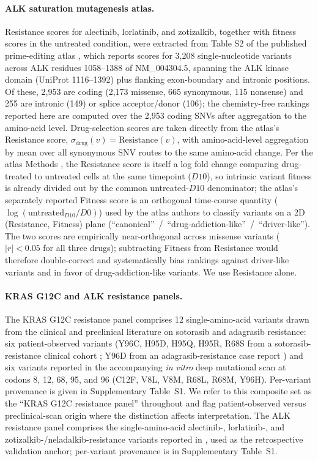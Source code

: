 \documentclass[11pt,a4paper]{article}
\begin{document}
\paragraph{ALK saturation mutagenesis atlas.}
Resistance scores for alectinib, lorlatinib, and zotizalkib, together with
fitness scores in the untreated condition, were extracted from Table S2
of the published prime-editing atlas \citep{oh2026}, which reports scores
for 3,208 single-nucleotide variants across ALK residues 1058--1388 of
NM\_004304.5, spanning the ALK kinase domain (UniProt 1116--1392) plus
flanking exon-boundary and intronic positions. Of these, 2,953 are coding (2,173
missense, 665 synonymous, 115 nonsense) and 255 are intronic (149) or
splice acceptor/donor (106); the chemistry-free rankings reported here
are computed over the 2,953 coding SNVs after aggregation to the
amino-acid level. Drug-selection scores are taken directly from the
atlas's Resistance score, $\sigma_{\mathrm{drug}}(v) =
\text{Resistance}(v)$, with amino-acid-level aggregation by mean over
all synonymous SNV routes to the same amino-acid change. Per the
atlas Methods \citep{oh2026}, the Resistance score is itself a
log fold change comparing drug-treated to untreated cells at the same
timepoint ($D10$), so intrinsic variant fitness is already divided out
by the common untreated-$D10$ denominator; the atlas's separately
reported Fitness score is an orthogonal time-course quantity
($\log(\text{untreated}_{D10}/D0)$) used by the atlas authors to
classify variants on a 2D (Resistance, Fitness) plane
(``canonical''~/~``drug-addiction-like''~/~``driver-like''). The two
scores are empirically near-orthogonal across missense variants
($|r| < 0.05$ for all three drugs); subtracting Fitness from
Resistance would therefore double-correct and systematically bias
rankings against driver-like variants and in favor of
drug-addiction-like variants. We use Resistance alone.

\paragraph{KRAS G12C and ALK resistance panels.}
The KRAS G12C resistance panel comprises 12 single-amino-acid variants
drawn from the clinical and preclinical literature on sotorasib and
adagrasib resistance: six patient-observed variants (Y96C, H95D, H95Q,
H95R, R68S from a sotorasib-resistance clinical cohort \citep{awad2021};
Y96D from an adagrasib-resistance case report \citep{tanaka2021}) and
six variants reported in the accompanying \textit{in vitro} deep
mutational scan \citep{awad2021} at codons 8, 12, 68, 95, and 96 (C12F,
V8L, V8M, R68L, R68M, Y96H). Per-variant provenance is given in
Supplementary Table~S1. We refer to this composite set as the
``KRAS G12C resistance panel'' throughout and flag patient-observed
versus preclinical-scan origin where the distinction affects
interpretation. The ALK resistance panel comprises the single-amino-acid
alectinib-, lorlatinib-, and zotizalkib-/neladalkib-resistance variants
reported in \citep{doi2022,takei2025}, used as the retrospective
validation anchor; per-variant provenance is in Supplementary Table~S1.
\end{document}
